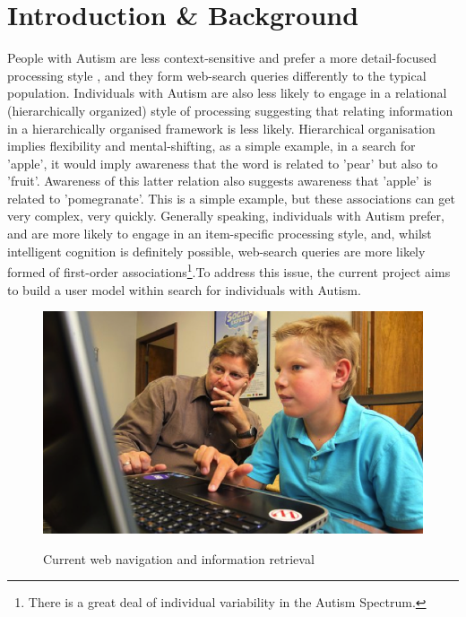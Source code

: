 \documentclass[a4paper, 10pt]{article}
\begin{document}
\section{Introduction \& Background}\label{prob}
People with Autism are less context-sensitive and prefer a more detail-focused processing style \cite{mottron}, and they form web-search queries differently to the typical population. Individuals with Autism are also less likely to engage in a relational (hierarchically organized) style of processing \cite{bowler} suggesting that relating information in a hierarchically organised framework is less likely. Hierarchical organisation implies flexibility and mental-shifting, as a simple example, in a search for 'apple', it would imply awareness that the word is related to 'pear' but also to 'fruit'. Awareness of this latter relation also suggests awareness that 'apple' is related to 'pomegranate'. This is a simple example, but these associations can get very complex, very quickly. Generally speaking, individuals with Autism prefer, and are more likely to engage in an item-specific processing style, and, whilst intelligent cognition is definitely possible, web-search queries are more likely formed of first-order associations\footnote{There is a great deal of individual variability in the Autism Spectrum.}.To address this issue, the current project aims to build a user model within search for individuals with Autism. 

\begin{figure}[H]
\begin{center}
\includegraphics[scale=0.2]{person}\\
\caption{Current web navigation and information retrieval \cite{person}}
\end{center}
\end{figure}
\end{document}
